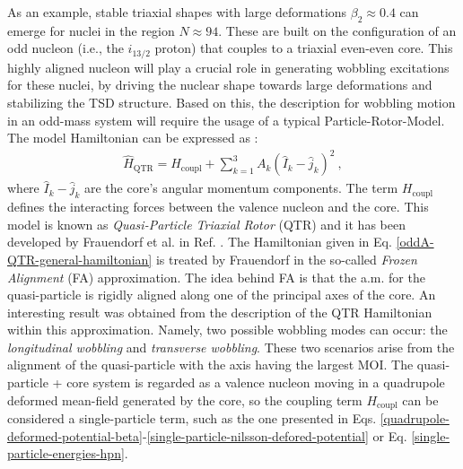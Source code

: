 As an example, stable triaxial shapes with large deformations $\beta_2\approx0.4$ can emerge for nuclei in the region $N\approx 94$. These are built on the configuration of an odd nucleon (i.e., the $i_{13/2}$ proton) that couples to a triaxial even-even core. This highly aligned nucleon will play a crucial role in generating wobbling excitations for these nuclei, by driving the nuclear shape towards large deformations and stabilizing the TSD structure. Based on this, the description for wobbling motion in an odd-mass system will require the usage of a typical Particle-Rotor-Model. The model Hamiltonian can be expressed as \cite{frauendorf2014transverse}:
\begin{align}
    \hat{H}_\text{QTR}=H_\text{coupl}+\sum_{k=1}^{3}A_k(\hat{I}_k-\hat{j}_k)^2\ ,
    \label{oddA-QTR-general-hamiltonian}
\end{align}
where $\hat{I}_k-\hat{j}_k$ are the core's angular momentum components. The term $H_\text{coupl}$ defines the interacting forces between the valence nucleon and the core. This model is known as \emph{Quasi-Particle Triaxial Rotor} (QTR) and it has been developed by Frauendorf et al. in Ref. \cite{frauendorf2014transverse}.
The Hamiltonian given in Eq. \ref{oddA-QTR-general-hamiltonian} is treated by Frauendorf in the so-called \emph{Frozen Alignment} (FA) approximation. The idea behind FA is that the a.m. for the quasi-particle is rigidly aligned along one of the principal axes of the core. An interesting result was obtained from the description of the QTR Hamiltonian within this approximation. Namely, two possible wobbling modes can occur: the \emph{longitudinal wobbling} and \emph{transverse wobbling}. These two scenarios arise from the alignment of the quasi-particle with the axis having the largest MOI. The quasi-particle + core system is regarded as a valence nucleon moving in a quadrupole deformed mean-field generated by the core, so the coupling term $H_\text{coupl}$ can be considered a single-particle term, such as the one presented in Eqs. \ref{quadrupole-deformed-potential-beta}-\ref{single-particle-nilsson-defored-potential} or Eq. \ref{single-particle-energies-hpn}.

